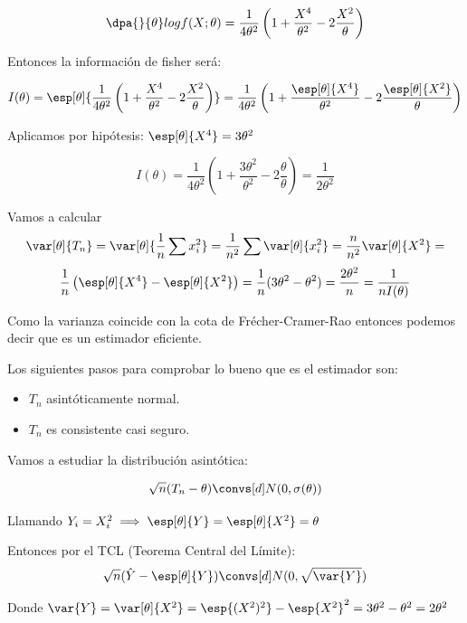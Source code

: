 \begin{problem}[2]
\[\dpa{}{\theta}logf(X;\theta) = \frac{1}{4\theta^2} \left( 1+\frac{X^4}{\theta^2} - 2\frac{X^2}{\theta}\right)\]

Entonces la información de fisher será:

\[I(\theta) = \esp[\theta]{\frac{1}{4\theta^2} \left( 1+\frac{X^4}{\theta^2} - 2\frac{X^2}{\theta}\right)} = \frac{1}{4\theta^2} \left( 1+\frac{\esp[\theta]{X^4}}{\theta^2} - 2\frac{\esp[\theta]{X^2}}{\theta}\right)\]

Aplicamos por hipótesis: $\esp[\theta]{X^4} = 3\theta^2$

\[I(\theta) = \frac{1}{4\theta^2} \left(1+\frac{3\theta^2}{\theta^2} - 2 \frac{\theta}{\theta}\right) = \frac{1}{2\theta^2}\]

Vamos a calcular \[\var[\theta]{T_n} = \var[\theta]{\frac{1}{n}\sum x_i^2} = \frac{1}{n^2}\sum \var[\theta]{x_i^2} = \frac{n}{n^2} \var[\theta]{X^2} =\]
\[ \frac{1}{n}\left(\esp[\theta]{X^4} - \esp[\theta]{X^2}\right) = \frac{1}{n}(3\theta^2-\theta^2) = \frac{2\theta^2}{n} = \frac{1}{nI(\theta)}\]

Como la varianza coincide con la cota de Frécher-Cramer-Rao entonces podemos decir que es un estimador eficiente.

Los siguientes pasos para comprobar lo bueno que es el estimador son: \begin{itemize}
\item $T_n$ asintóticamente normal.
\item $T_n$ es consistente casi seguro.
\end{itemize}

\spart Vamos a estudiar la distribución asintótica:

\[\sqrt{n}(T_n-\theta) \convs[d] N(0,\sigma(\theta))\]

Llamando $Y_i = X_i^2 \implies \esp[\theta]{Y} = \esp[\theta]{X^2} = \theta$

Entonces por el TCL (Teorema Central del Límite): \[\displaystyle \sqrt{n}(\hat{Y} - \esp[\theta]{Y}) \convs[d] N(0,\sqrt{\var{Y}})\]

Donde $\var{Y} = \var[\theta]{X^2} = \esp{(X^2)^2} - \esp{X^2}^2 = 3\theta^2 - \theta^2 = 2\theta^2$
\end{problem}



